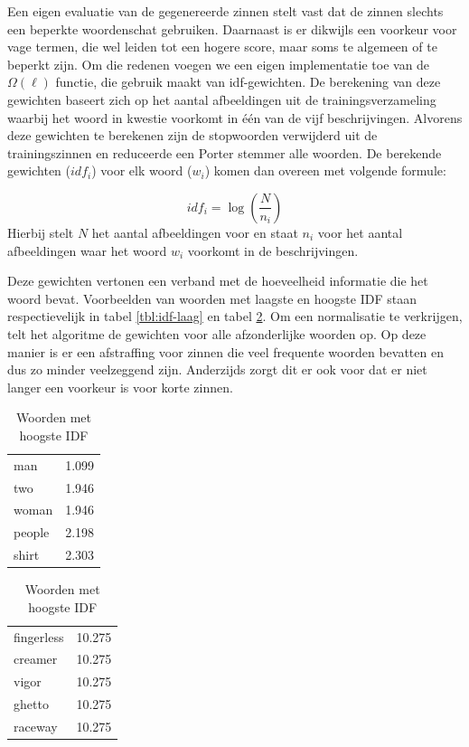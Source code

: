 Een eigen evaluatie van de gegenereerde zinnen stelt vast dat de zinnen slechts een beperkte woordenschat gebruiken. Daarnaast is er dikwijls een voorkeur voor vage termen, die wel leiden tot een hogere score, maar soms te algemeen of te beperkt zijn.
Om die redenen voegen we een eigen implementatie toe van de $\Omega(\ell)$ functie, die gebruik maakt van idf-gewichten. De berekening van deze gewichten baseert zich op het aantal afbeeldingen uit de trainingsverzameling waarbij het woord in kwestie voorkomt in \'e\'en van de vijf beschrijvingen. Alvorens deze gewichten te berekenen zijn de stopwoorden verwijderd uit de trainingszinnen en reduceerde een Porter stemmer alle woorden. De berekende gewichten ($idf_i$) voor elk woord ($w_i$) komen dan overeen met volgende formule: 


\begin{equation}
    idf_i = \log(\frac{N}{n_i})
\end{equation}
Hierbij stelt $N$ het aantal afbeeldingen voor en staat $n_i$ voor het aantal afbeeldingen waar het woord $w_i$ voorkomt in de beschrijvingen.

Deze gewichten vertonen een verband met de hoeveelheid informatie die het woord bevat. Voorbeelden van woorden met laagste en hoogste IDF staan respectievelijk in tabel \ref{tbl:idf-laag} en tabel \ref{tbl:idf-hoog}. Om een normalisatie te verkrijgen, telt het algoritme de gewichten voor alle afzonderlijke woorden op. Op deze manier is er een afstraffing voor zinnen die veel frequente woorden bevatten en dus zo minder veelzeggend zijn. Anderzijds zorgt dit er ook voor dat er niet langer een voorkeur is voor korte zinnen.


\begin{table}[!htb]
	\caption*{Gestemde woorden samen met hun IDF-gewicht}
	\begin{minipage}{.5\linewidth}
		\caption{Woorden met laagste IDF}
		\label{tbl:idf-laag}
		\centering
		\begin{tabular}{ll}
    man    & 1.099 \\
    two    & 1.946 \\
    woman  & 1.946 \\
    people & 2.198 \\
    shirt  & 2.303 \\
		\end{tabular}
	\end{minipage}%
	\begin{minipage}{.5\linewidth}
		\centering
		\caption{Woorden met hoogste IDF}
		\label{tbl:idf-hoog}
		\begin{tabular}{ll}
	fingerless & 10.275\\
	creamer& 10.275\\
	vigor& 10.275\\
	ghetto& 10.275\\
	raceway& 10.275\\
		\end{tabular}
	\end{minipage} 
\end{table}

